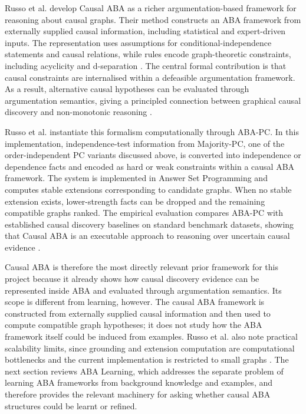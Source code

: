 Russo et al. develop Causal ABA as a richer argumentation-based framework for reasoning about causal graphs. Their method constructs an ABA framework from externally supplied causal information, including statistical and expert-driven inputs. The representation uses assumptions for conditional-independence statements and causal relations, while rules encode graph-theoretic constraints, including acyclicity and d-separation \cite{russo2024argumentative}. The central formal contribution is that causal constraints are internalised within a defeasible argumentation framework. As a result, alternative causal hypotheses can be evaluated through argumentation semantics, giving a principled connection between graphical causal discovery and non-monotonic reasoning \cite{russo2024argumentative}.

Russo et al. instantiate this formalism computationally through ABA-PC. In this implementation, independence-test information from Majority-PC, one of the order-independent PC variants discussed above, is converted into independence or dependence facts and encoded as hard or weak constraints within a causal ABA framework. The system is implemented in Answer Set Programming and computes stable extensions corresponding to candidate graphs. When no stable extension exists, lower-strength facts can be dropped and the remaining compatible graphs ranked. The empirical evaluation compares ABA-PC with established causal discovery baselines on standard benchmark datasets, showing that Causal ABA is an executable approach to reasoning over uncertain causal evidence \cite{russo2024argumentative}.

Causal ABA is therefore the most directly relevant prior framework for this project because it already shows how causal discovery evidence can be represented inside ABA and evaluated through argumentation semantics. Its scope is different from learning, however. The causal ABA framework is constructed from externally supplied causal information and then used to compute compatible graph hypotheses; it does not study how the ABA framework itself could be induced from examples. Russo et al. also note practical scalability limits, since grounding and extension computation are computational bottlenecks and the current implementation is restricted to small graphs \cite{russo2024argumentative}. The next section reviews ABA Learning, which addresses the separate problem of learning ABA frameworks from background knowledge and examples, and therefore provides the relevant machinery for asking whether causal ABA structures could be learnt or refined.

